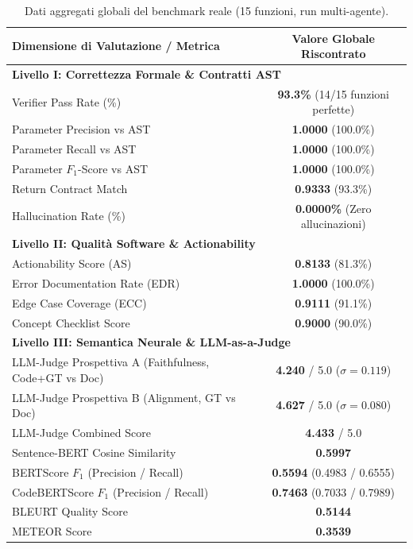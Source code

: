\begin{table}[htbp]
\centering
\caption{Dati aggregati globali del benchmark reale (15 funzioni, run multi-agente).}
\label{tab:benchmark_aggregate_summary}
\begin{tabular}{lc}
\toprule
\textbf{Dimensione di Valutazione / Metrica} & \textbf{Valore Globale Riscontrato} \\
\midrule
\multicolumn{2}{l}{\textbf{Livello I: Correttezza Formale \& Contratti AST}} \\
Verifier Pass Rate (\%) & \textbf{93.3\%} (14/15 funzioni perfette) \\
Parameter Precision vs AST & \textbf{1.0000} (100.0\%) \\
Parameter Recall vs AST & \textbf{1.0000} (100.0\%) \\
Parameter $F_1$-Score vs AST & \textbf{1.0000} (100.0\%) \\
Return Contract Match & \textbf{0.9333} (93.3\%) \\
Hallucination Rate (\%) & \textbf{0.0000\%} (Zero allucinazioni) \\
\midrule
\multicolumn{2}{l}{\textbf{Livello II: Qualità Software \& Actionability}} \\
Actionability Score (AS) & \textbf{0.8133} (81.3\%) \\
Error Documentation Rate (EDR) & \textbf{1.0000} (100.0\%) \\
Edge Case Coverage (ECC) & \textbf{0.9111} (91.1\%) \\
Concept Checklist Score & \textbf{0.9000} (90.0\%) \\
\midrule
\multicolumn{2}{l}{\textbf{Livello III: Semantica Neurale \& LLM-as-a-Judge}} \\
LLM-Judge Prospettiva A (Faithfulness, Code+GT vs Doc) & \textbf{4.240} / 5.0 ($\sigma = 0.119$) \\
LLM-Judge Prospettiva B (Alignment, GT vs Doc) & \textbf{4.627} / 5.0 ($\sigma = 0.080$) \\
LLM-Judge Combined Score & \textbf{4.433} / 5.0 \\
Sentence-BERT Cosine Similarity & \textbf{0.5997} \\
BERTScore $F_1$ (Precision / Recall) & \textbf{0.5594} (0.4983 / 0.6555) \\
CodeBERTScore $F_1$ (Precision / Recall) & \textbf{0.7463} (0.7033 / 0.7989) \\
BLEURT Quality Score & \textbf{0.5144} \\
METEOR Score & \textbf{0.3539} \\

\end{tabular}
\end{table}
